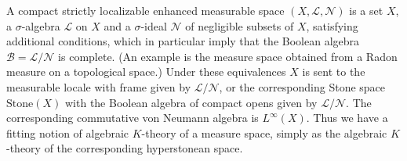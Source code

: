 \documentclass[10pt]{amsart}
\theoremstyle{definition}
\begin{document}
A compact strictly localizable enhanced measurable space $(X, \mathcal{L}, \mathcal{N})$ is a set $X$, a $\sigma$-algebra $\mathcal{L}$ on $X$ and a $\sigma$-ideal $\mathcal{N}$ of negligible subsets of $X$, satisfying additional conditions, which in particular imply that the Boolean algebra $\mathcal{B} = \mathcal{L}/\mathcal{N}$ is complete. (An example is the measure space obtained from a Radon measure on a topological space.) Under these equivalences $X$ is sent to the measurable locale with frame given by $\mathcal{L}/\mathcal{N}$, or the corresponding Stone space $\mathrm{Stone}(X)$ with the Boolean algebra of compact opens given by $\mathcal{L}/\mathcal{N}$. The corresponding commutative von Neumann algebra is $L^\infty(X)$. Thus we have a fitting notion of algebraic $K$-theory of a measure space, simply as the algebraic $K$-theory of the corresponding hyperstonean space.


\appendix








\begingroup
\setlength{\emergencystretch}{8em}
\printbibliography
\endgroup
\end{document}
